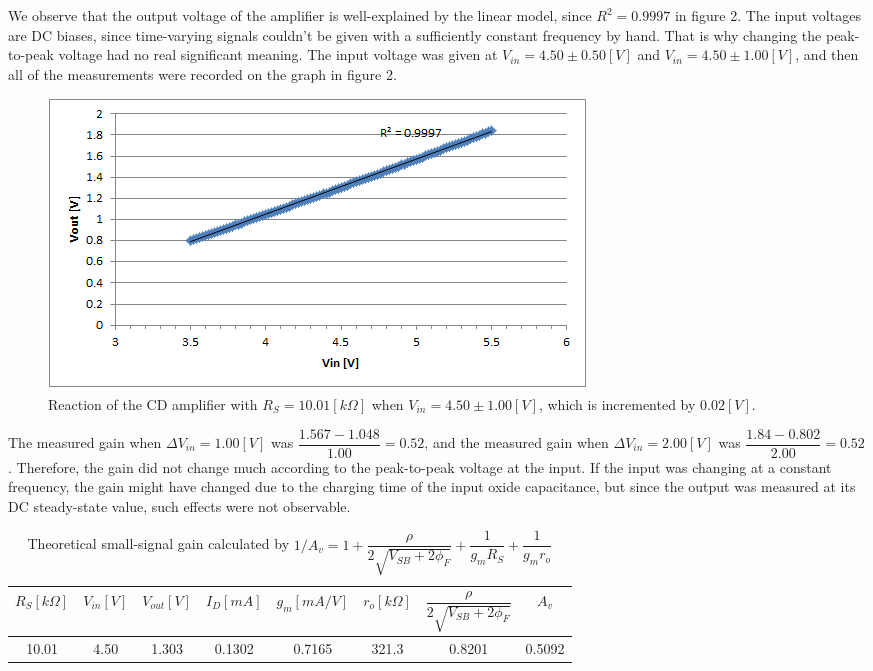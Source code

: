 \documentclass[a4paper, itemph]{oblivoir}
\theoremstyle{definition}
\begin{document}
We observe that the output voltage of the amplifier is well-explained by the linear model, since $R^2=0.9997$ in figure 2. The input voltages are DC biases, since time-varying signals couldn't be given with a sufficiently constant frequency by hand. That is why changing the peak-to-peak voltage had no real significant meaning. The input voltage was given at $V_{in}=4.50\pm 0.50[V]$ and $V_{in}=4.50 \pm 1.00[V]$, and then all of the measurements were recorded on the graph in figure 2.
\begin{figure}[htb]
    \centering
    \includegraphics{10010_gain.png}
    \caption{Reaction of the CD amplifier with $R_S=10.01[k\Omega]$ when $V_{in}=4.50\pm 1.00[V]$, which is incremented by $0.02[V]$.}
\end{figure}

The measured gain when $\Delta V_{in}=1.00[V]$ was $\dfrac{1.567-1.048}{1.00}=0.52$, and the measured gain when $\Delta V_{in}=2.00[V]$ was $\dfrac{1.84-0.802}{2.00}=0.52$. Therefore, the gain did not change much according to the peak-to-peak voltage at the input. If the input was changing at a constant frequency, the gain might have changed due to the charging time of the input oxide capacitance, but since the output was measured at its DC steady-state value, such effects were not observable.
\begin{table}[htb]
    \centering
    \begin{tabular}{c|c|c|c|c|c|c|c}
         $R_S[k\Omega]$& $V_{in}[V]$ & $V_{out}[V]$ & $I_D[mA]$ & $g_m[mA/V]$ & $r_o[k\Omega]$ & $\dfrac{\rho}{2\sqrt{V_{SB}+2\phi_F}}$ & $A_v$ \\
         \hline
         10.01&4.50 & 1.303 & 0.1302 & 0.7165 & 321.3 & 0.8201 & 0.5092 
    \end{tabular}
    \caption{Theoretical small-signal gain calculated by $1/A_v=1+\dfrac{\rho}{2\sqrt{V_{SB}+2\phi_F}}+\dfrac{1}{g_mR_S}+\dfrac{1}{g_mr_o}$}
\end{table}
\end{document}
